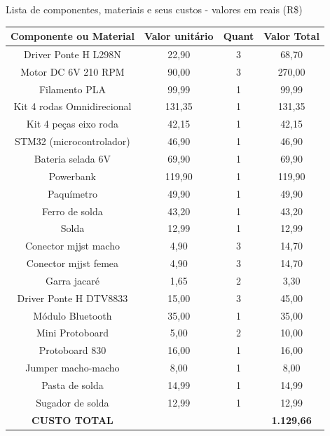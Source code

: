 \begin{quadro}[htb]
	\caption{Lista de componentes, materiais e seus custos - valores em reais (R\$) \label{custos}}
	 \begin{tabular}{|c|c|c|c|}
		\hline
		\textbf{Componente ou Material} & \textbf{Valor unitário} & \textbf{Quant} & \textbf{Valor Total} \\ \hline
		Driver Ponte H L298N \cite{l298n_produto} &  22,90 & 3 &  68,70   \\ \hline
		Motor DC 6V 210 RPM \cite{motor_dc_6v_produto} &  90,00 & 3 &  270,00   \\ \hline
		Filamento PLA \cite{filamento_pla_produto} &  99,99 & 1 &  99,99   \\ \hline
		Kit 4 rodas Omnidirecional \cite{omin_wheel_produto} &  131,35 & 1 &  131,35   \\ \hline
		Kit 4 peças eixo roda \cite{omin_wheel_produto} &  42,15 & 1 &  42,15   \\ \hline
		STM32 (microcontrolador) \cite{stm32_produto} &  46,90 & 1 &  46,90   \\ \hline
		Bateria selada 6V \cite{bateria_6v_produto} &  69,90 & 1 &  69,90  \\ \hline
		Powerbank &  119,90 & 1 &  119,90   \\ \hline
		Paquímetro  &  49,90 & 1 &  49,90   \\ \hline
		Ferro de solda &  43,20 & 1 &  43,20   \\ \hline
		Solda &  12,99 & 1 &  12,99   \\ \hline
		Conector mjjst macho &  4,90 & 3 &  14,70   \\ \hline
		Conector mjjst femea &  4,90 & 3 &  14,70   \\ \hline
		Garra jacaré &  1,65 & 2 &  3,30   \\ \hline
		Driver Ponte H DTV8833 \cite{drv8833_produto} &  15,00 & 3 &  45,00   \\ \hline
		Módulo Bluetooth \cite{hc05_produto} &  35,00 & 1 &  35,00   \\ \hline
		Mini Protoboard &  5,00 & 2 &  10,00   \\ \hline
		Protoboard 830 &  16,00 & 1 &  16,00   \\ \hline
		Jumper macho-macho &  8,00 & 1 &  8,00   \\ \hline
		Pasta de solda &  14,99 & 1 &  14,99   \\ \hline
		Sugador de solda &  12,99 & 1 &  12,99   \\ \hline	
		\textbf{CUSTO TOTAL} & & & \textbf{ 1.129,66}   \\ \hline
	\end{tabular}
\end{quadro}

